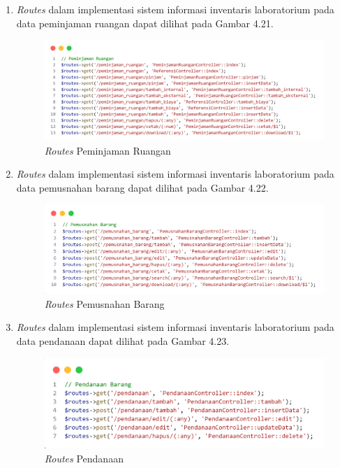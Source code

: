 \begin{enumerate}
  \item \textit{Routes} dalam implementasi sistem informasi inventaris laboratorium pada data peminjaman ruangan dapat dilihat pada Gambar 4.21.

        \begin{figure}
          \centering
          \includegraphics[width=0.82\linewidth]{konten//gambar/routes peminjaman ruangan.png}
          \caption{\textit{Routes} Peminjaman Ruangan}
          \label{fig:enter-label}
        \end{figure}

  \item \textit{Routes} dalam implementasi sistem informasi inventaris laboratorium pada data pemusnahan barang dapat dilihat pada Gambar 4.22.

        \begin{figure}
          \centering
          \includegraphics[width=0.82\linewidth]{konten//gambar/routes pemusnahan barang.png}
          \caption{\textit{Routes} Pemusnahan Barang}
          \label{fig:enter-label}
        \end{figure}

  \item \textit{Routes} dalam implementasi sistem informasi inventaris laboratorium pada data pendanaan dapat dilihat pada Gambar 4.23.

        \begin{figure}
          \centering
          \includegraphics[width=0.82\linewidth]{konten//gambar/routes pendanaan.png}
          \caption{\textit{Routes} Pendanaan}
          \label{fig:enter-label}
        \end{figure}


\end{enumerate}
